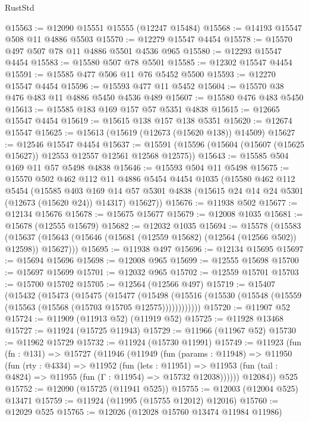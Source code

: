 \begin{lexlean}{RustStd}
\begin{coremodule}
@15563 := @12090 @15551 @15555 (@12247 @15484)
@15568 := @14193 @15547 @508 @11 @4886 @5503
@15570 := @12279 @15547 @4454
@15578 := @15570 @497 @507 @78 @11 @4886 @5501 @4536 @965
@15580 := @12293 @15547 @4454
@15583 := @15580 @507 @78 @5501
@15585 := @12302 @15547 @4454
@15591 := @15585 @477 @506 @11 @76 @5452 @5500
@15593 := @12270 @15547 @4454
@15596 := @15593 @477 @11 @5452
@15604 := @15570 @38 @476 @483 @11 @4886 @5450 @4536 @489
@15607 := @15580 @476 @483 @5450
@15613 := @15585 @183 @169 @157 @57 @5351 @4838
@15615 := @12665 @15547 @4454
@15619 := @15615 @138 @157 @138 @5351
@15620 := @12674 @15547
@15625 := @15613 (@15619 (@12673 (@15620 @138)) @14509)
@15627 := @12546 @15547 @4454
@15637 := @15591 (@15596 (@15604 (@15607 (@15625 @15627)) @12553 @12557 @12561 @12568 @12575))
@15643 := @15585 @504 @169 @11 @57 @5498 @4838
@15646 := @15593 @504 @11 @5498
@15675 := @15570
    @502
    @462
    @112
    @11
    @4886
    @5454
    @4454
    @1035
    (@15580
      @462
      @112
      @5454
      (@15585
        @403
        @169
        @14
        @57
        @5301
        @4838
        (@15615 @24 @14 @24 @5301 (@12673 (@15620 @24)) @14317)
        @15627))
@15676 := @11938 @502
@15677 := @12134 @15676
@15678 := @15675 @15677
@15679 := @12008 @1035
@15681 := @15678 (@12555 @15679)
@15682 := @12032 @1035
@15694 := @15578
    (@15583
      (@15637 (@15643 (@15646 (@15681 (@12559 @15682) (@12564 (@12566 @502)) @12598)) @15627)))
@15695 := @11938 @497
@15696 := @12134 @15695
@15697 := @15694 @15696
@15698 := @12008 @965
@15699 := @12555 @15698
@15700 := @15697 @15699
@15701 := @12032 @965
@15702 := @12559 @15701
@15703 := @15700 @15702
@15705 := @12564 (@12566 @497)
@15719 := @15407
    (@15432
      (@15473
        (@15475
          (@15477
            (@15498
              (@15516 (@15530 (@15548 (@15559 (@15563 (@15568 (@15703 @15705 @12575))))))))))))
@15720 := @11907 @52
@15724 := @11909 (@11913 @52) (@11919 @52)
@15725 := @11928 @13468
@15727 := @11924 (@15725 @11943)
@15729 := @11966 (@11967 @52)
@15730 := @11962 @15729
@15732 := @11924 (@15730 @11991)
@15749 := @11923
    (fun (fn : @131) =>
    @15727
      (@11946
        (@11949
          (fun (params : @11948) =>
          @11950
            (fun (rty : @4334) =>
            @11952
              (fun (lets : @11951) =>
              @11953 (fun (tail : @4824) => @11955 (fun (Γ : @11954) => @15732 @12038))))))
        @12084))
    @525
@15752 := @12090 (@15725 (@11941 @525))
@15755 := @12003 (@12004 @525) @13471
@15759 := @11924 (@11995 (@15755 @12012) @12016)
@15760 := @12029 @525
@15765 := @12026 (@12028 @15760 @13474 @11984 @11986)

\end{coremodule}
\end{lexlean}
